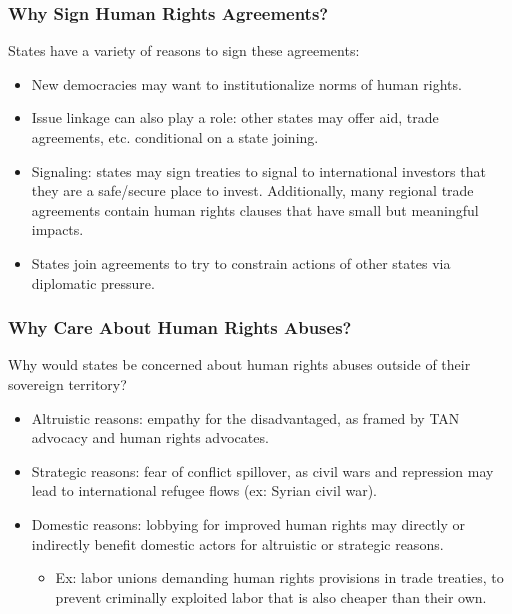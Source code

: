 \documentclass{beamer}
\begin{document}
\begin{frame} 
	\frametitle{\LARGE{Why Sign Human Rights Agreements?}}
	States have a variety of reasons to sign these agreements:
	\begin{itemize}
		\item New democracies may want to institutionalize norms of human rights. \pause
		\item Issue linkage can also play a role: other states may offer aid, trade agreements, etc. conditional on a state joining. \pause 
		\item Signaling: states may sign treaties to signal to international investors that they are a safe/secure place to invest. Additionally, many regional trade agreements contain human rights clauses that have small but meaningful impacts. \pause
		\item States join agreements to try to constrain actions of other states via diplomatic pressure.
		
	\end{itemize}
\end{frame}

\begin{frame} 
	\frametitle{\LARGE{Why Care About Human Rights Abuses?}}
	Why would states be concerned about human rights abuses outside of their sovereign territory?
	\begin{itemize}
		\item Altruistic reasons: empathy for the disadvantaged, as framed by TAN advocacy and human rights advocates. \pause
		\item Strategic reasons: fear of conflict spillover, as civil wars and repression may lead to international refugee flows (ex: Syrian civil war). \pause 
		\item Domestic reasons: lobbying for improved human rights may directly or indirectly benefit domestic actors for altruistic or strategic reasons. \pause
		\begin{itemize}
			\item Ex: labor unions demanding human rights provisions in trade treaties, to prevent criminally exploited labor that is also cheaper than their own.
		\end{itemize} 
		
	\end{itemize}
\end{frame}
\end{document}
